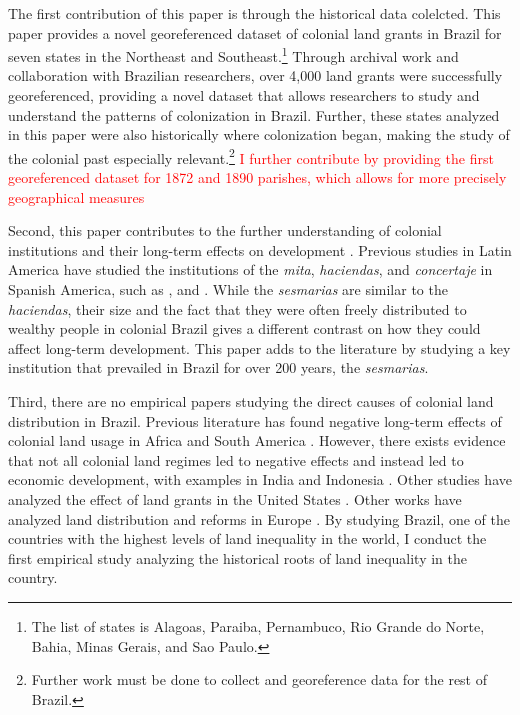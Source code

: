\documentclass[11pt]{article}
\newcommand{\red}[1]{\textcolor{red}{#1}}
\begin{document}
The first contribution of this paper is through the historical data colelcted.
This paper provides a novel georeferenced dataset of colonial land grants in Brazil for seven states in the Northeast and Southeast.\footnote{The list of states is Alagoas, Paraiba, Pernambuco, Rio Grande do Norte, Bahia, Minas Gerais, and Sao Paulo.}
Through archival work and collaboration with Brazilian researchers, over 4,000 land grants were successfully georeferenced, providing a novel dataset that allows researchers to study and understand the patterns of colonization in Brazil.
Further, these states analyzed in this paper were also historically where colonization began, making the study of the colonial past especially relevant.\footnote{Further work must be done to collect and georeference data for the rest of Brazil.}
\red{I further contribute by providing the first georeferenced dataset for 1872 and 1890 parishes, which allows for more precisely geographical measures} 

Second, this paper contributes to the further understanding of colonial institutions and their long-term effects on development \parencite{Engerman2002-ju, Acemoglu2005-ti, Eslava2023-eq, Bruhn2012-cc}. 
Previous studies in Latin America have studied the institutions of the \textit{mita}, \textit{haciendas}, and \textit{concertaje} in Spanish America, such as \textcite{Dell2010-qt}, \textcite{Faguet2022-sr} and \textcite{Rivadeneira2024-uj}.
While the \textit{sesmarias} are similar to the \textit{haciendas}, their size and the fact that they were often freely distributed to wealthy people in colonial Brazil gives a different contrast on how they could affect long-term development.
This paper adds to the literature by studying a key institution that prevailed in Brazil for over 200 years, the \textit{sesmarias}.

Third, there are no empirical papers studying the direct causes of colonial land distribution in Brazil. 
Previous literature has found negative long-term effects of colonial land usage in Africa and South America \parencite{Dell2010-qt, Lowes2021-ww, Montero2022-ua}. 
However, there exists evidence that not all colonial land regimes led to negative effects and instead led to economic development, with examples in India and Indonesia \parencite{Banerjee2005-ki, Dell2020-zo, Ratnoo2023-vw, Caum-Julio2023-ei}.  
Other studies have analyzed the effect of land grants in the United States \parencite{Akee2014-uw, Allen2019-kh, Smith2023-ip}. 
Other works have analyzed land distribution and reforms in Europe \parencite{Reed2012-qy, Goni2022-do}.
By studying Brazil, one of the countries with the highest levels of land inequality in the world, I conduct the first empirical study analyzing the historical roots of land inequality in the country.
\end{document}
